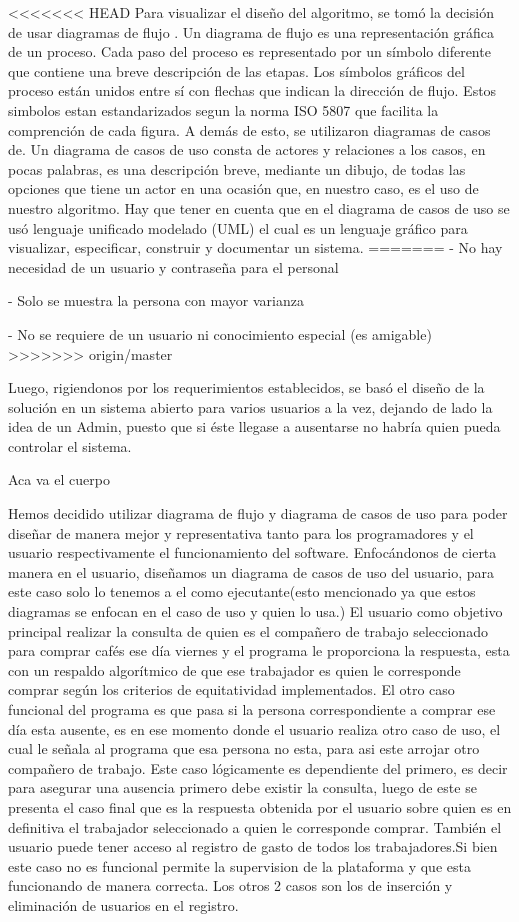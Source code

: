 \documentclass[twocolumn,11pts]{IEEEtran}
\begin{document}
<<<<<<< HEAD
Para visualizar el diseño del algoritmo, se tomó la decisión de usar diagramas de flujo . Un diagrama de flujo es una representación gráfica de un proceso. Cada paso del proceso es representado por un símbolo diferente que  contiene una breve descripción de las etapas. Los símbolos gráficos del proceso están unidos entre sí con flechas que indican la dirección de flujo. Estos simbolos estan estandarizados segun la norma ISO 5807 que facilita la comprención de cada figura.
A demás de esto, se utilizaron diagramas de casos de. Un diagrama de casos de uso consta de actores y relaciones a los casos, en pocas palabras, es una descripción breve, mediante un dibujo, de todas las opciones que tiene un actor en una ocasión que, en nuestro caso, es el uso de nuestro algoritmo. Hay que tener en cuenta que en el diagrama de casos de uso se usó lenguaje unificado modelado (UML) el cual es un lenguaje gráfico para visualizar, especificar, construir y documentar un sistema.
=======
- No hay necesidad de un usuario y contraseña para el personal

- Solo se muestra la persona con mayor varianza

- No se requiere de un usuario ni conocimiento especial (es amigable)
>>>>>>> origin/master

Luego, rigiendonos por los requerimientos establecidos, se basó el diseño de la solución en un sistema abierto para varios usuarios a la vez, dejando de lado la idea de un Admin, puesto que si éste llegase a ausentarse no habría quien pueda controlar el sistema.


Aca va el cuerpo

Hemos decidido utilizar diagrama de flujo y diagrama de casos de uso para poder diseñar de manera mejor y representativa tanto para los programadores y el usuario respectivamente el funcionamiento del software.
Enfocándonos de cierta manera en el usuario, diseñamos un diagrama de casos de uso del usuario, para este caso solo lo tenemos a el como ejecutante(esto mencionado ya que estos diagramas se enfocan en el caso de uso y quien lo usa.)
El usuario como objetivo principal realizar la consulta de quien es el compañero de trabajo seleccionado para comprar cafés ese día viernes y el programa le proporciona la respuesta, esta con un respaldo algorítmico de que ese trabajador es quien le corresponde comprar según los criterios de equitatividad implementados.
El otro caso funcional del programa es que pasa si la persona correspondiente a comprar ese día esta ausente, es en ese momento donde el usuario realiza otro caso de uso, el cual le señala al programa que esa persona no esta, para asi este arrojar otro compañero de trabajo.
Este caso lógicamente es dependiente del primero, es decir para asegurar una ausencia primero debe existir la consulta, luego de este se presenta el caso final que es la respuesta obtenida por el usuario sobre quien es en definitiva el trabajador seleccionado a quien le corresponde comprar.
También el usuario puede tener acceso al registro de gasto de todos los trabajadores.Si bien este caso no es funcional permite la supervision de la plataforma y que esta funcionando de manera correcta.
Los otros 2 casos son los de inserción y eliminación de usuarios en el registro.
\end{document}
